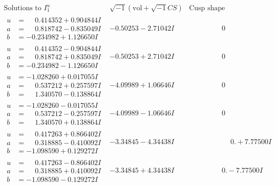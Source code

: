 \documentclass[1p]{elsarticle_modified}
\theoremstyle{definition}
\newcommand{\I}{\sqrt{-1}}
\begin{document}
$$\begin{array}{c|c|c}  
\text{Solutions to }I^u_{1}& \I (\text{vol} + \sqrt{-1}CS) & \text{Cusp shape}\\
 \hline 
\begin{aligned}
u &= \phantom{-}0.414352 + 0.904844 I \\
a &= \phantom{-}0.818742 - 0.835049 I \\
b &= -0.234982 + 1.126650 I\end{aligned}
 & -0.50253 - 2.71042 I & \phantom{-0.000000 } 0 \\ \hline\begin{aligned}
u &= \phantom{-}0.414352 - 0.904844 I \\
a &= \phantom{-}0.818742 + 0.835049 I \\
b &= -0.234982 - 1.126650 I\end{aligned}
 & -0.50253 + 2.71042 I & \phantom{-0.000000 } 0 \\ \hline\begin{aligned}
u &= -1.028260 + 0.017055 I \\
a &= \phantom{-}0.537212 + 0.257597 I \\
b &= \phantom{-}1.340570 - 0.138864 I\end{aligned}
 & -4.09989 + 1.06646 I & \phantom{-0.000000 } 0 \\ \hline\begin{aligned}
u &= -1.028260 - 0.017055 I \\
a &= \phantom{-}0.537212 - 0.257597 I \\
b &= \phantom{-}1.340570 + 0.138864 I\end{aligned}
 & -4.09989 - 1.06646 I & \phantom{-0.000000 } 0 \\ \hline\begin{aligned}
u &= \phantom{-}0.417263 + 0.866402 I \\
a &= \phantom{-}0.318885 - 0.410092 I \\
b &= -1.098590 + 0.129272 I\end{aligned}
 & -3.34845 - 4.34438 I & \phantom{-0.000000 -}0. + 7.77500 I \\ \hline\begin{aligned}
u &= \phantom{-}0.417263 - 0.866402 I \\
a &= \phantom{-}0.318885 + 0.410092 I \\
b &= -1.098590 - 0.129272 I\end{aligned}
 & -3.34845 + 4.34438 I & \phantom{-0.000000 } 0. - 7.77500 I \\ \hline\begin{aligned}

\end{aligned}
\end{array}$$
\end{document}
